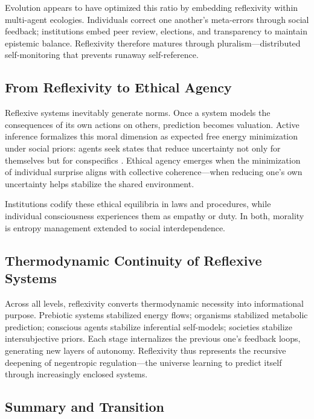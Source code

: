 \documentclass[11pt,a4paper]{article}
\begin{document}
Evolution appears to have optimized this ratio by embedding reflexivity within multi-agent ecologies.  Individuals correct one another’s meta-errors through social feedback; institutions embed peer review, elections, and transparency to maintain epistemic balance.  Reflexivity therefore matures through pluralism—distributed self-monitoring that prevents runaway self-reference.

\subsection{From Reflexivity to Ethical Agency}

Reflexive systems inevitably generate norms.  Once a system models the consequences of its own actions on others, prediction becomes valuation.  Active inference formalizes this moral dimension as expected free energy minimization under social priors: agents seek states that reduce uncertainty not only for themselves but for conspecifics \citep{Albarracin2022FromGenerativeModels, Hipolito2023EnactiveDynamicSocial}.  Ethical agency emerges when the minimization of individual surprise aligns with collective coherence—when reducing one’s own uncertainty helps stabilize the shared environment.

Institutions codify these ethical equilibria in laws and procedures, while individual consciousness experiences them as empathy or duty.  In both, morality is entropy management extended to social interdependence.

\subsection{Thermodynamic Continuity of Reflexive Systems}

Across all levels, reflexivity converts thermodynamic necessity into informational purpose.  Prebiotic systems stabilized energy flows; organisms stabilized metabolic prediction; conscious agents stabilize inferential self-models; societies stabilize intersubjective priors.  Each stage internalizes the previous one’s feedback loops, generating new layers of autonomy.  Reflexivity thus represents the recursive deepening of negentropic regulation—the universe learning to predict itself through increasingly enclosed systems.

\subsection{Summary and Transition}
\end{document}
